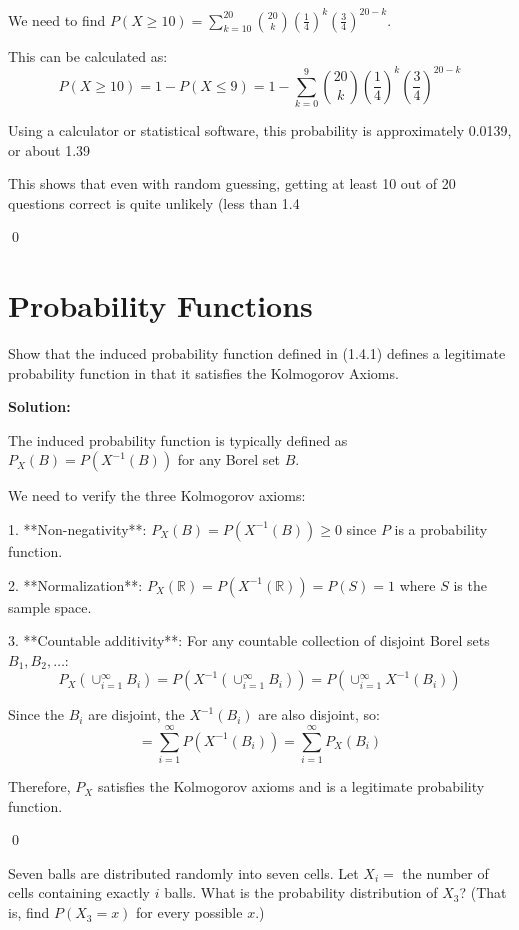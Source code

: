 We need to find $P(X \geq 10) = \sum_{k=10}^{20} \binom{20}{k} \left(\frac{1}{4}\right)^k \left(\frac{3}{4}\right)^{20-k}$.

This can be calculated as:
\[ P(X \geq 10) = 1 - P(X \leq 9) = 1 - \sum_{k=0}^{9} \binom{20}{k} \left(\frac{1}{4}\right)^k \left(\frac{3}{4}\right)^{20-k} \]

Using a calculator or statistical software, this probability is approximately 0.0139, or about 1.39%

This shows that even with random guessing, getting at least 10 out of 20 questions correct is quite unlikely (less than 1.4%



\qed
\section{Probability Functions}

\begin{problembox}
Show that the induced probability function defined in (1.4.1) defines a legitimate probability function in that it satisfies the Kolmogorov Axioms.
\end{problembox}

\noindent\textbf{Solution:}

The induced probability function is typically defined as $P_X(B) = P(X^{-1}(B))$ for any Borel set $B$.

We need to verify the three Kolmogorov axioms:

1. **Non-negativity**: $P_X(B) = P(X^{-1}(B)) \geq 0$ since $P$ is a probability function.

2. **Normalization**: $P_X(\mathbb{R}) = P(X^{-1}(\mathbb{R})) = P(S) = 1$ where $S$ is the sample space.

3. **Countable additivity**: For any countable collection of disjoint Borel sets $B_1, B_2, \ldots$:
   \[ P_X(\cup_{i=1}^{\infty} B_i) = P(X^{-1}(\cup_{i=1}^{\infty} B_i)) = P(\cup_{i=1}^{\infty} X^{-1}(B_i)) \]
   
   Since the $B_i$ are disjoint, the $X^{-1}(B_i)$ are also disjoint, so:
   \[ = \sum_{i=1}^{\infty} P(X^{-1}(B_i)) = \sum_{i=1}^{\infty} P_X(B_i) \]

Therefore, $P_X$ satisfies the Kolmogorov axioms and is a legitimate probability function.



\qed
\begin{problembox}
Seven balls are distributed randomly into seven cells. Let $X_{i}=$ the number of cells containing exactly $i$ balls. What is the probability distribution of $X_{3}$? (That is, find $P(X_{3}=x)$ for every possible $x$.)
\end{problembox}

